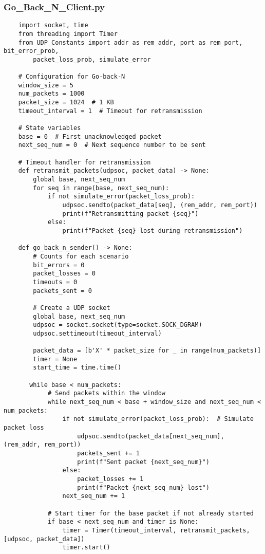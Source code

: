 \documentclass{article}
\begin{document}
\subsubsection{Go\_Back\_N\_Client.py}

\begin{verbatim}
    import socket, time
    from threading import Timer
    from UDP_Constants import addr as rem_addr, port as rem_port, bit_error_prob,
        packet_loss_prob, simulate_error

    # Configuration for Go-back-N
    window_size = 5
    num_packets = 1000
    packet_size = 1024  # 1 KB
    timeout_interval = 1  # Timeout for retransmission

    # State variables
    base = 0  # First unacknowledged packet
    next_seq_num = 0  # Next sequence number to be sent

    # Timeout handler for retransmission
    def retransmit_packets(udpsoc, packet_data) -> None:
        global base, next_seq_num
        for seq in range(base, next_seq_num):
            if not simulate_error(packet_loss_prob):
                udpsoc.sendto(packet_data[seq], (rem_addr, rem_port))
                print(f"Retransmitting packet {seq}")
            else:
                print(f"Packet {seq} lost during retransmission")

    def go_back_n_sender() -> None:
        # Counts for each scenario
        bit_errors = 0
        packet_losses = 0
        timeouts = 0
        packets_sent = 0

        # Create a UDP socket
        global base, next_seq_num
        udpsoc = socket.socket(type=socket.SOCK_DGRAM)
        udpsoc.settimeout(timeout_interval)

        packet_data = [b'X' * packet_size for _ in range(num_packets)]
        timer = None
        start_time = time.time()

       while base < num_packets:
            # Send packets within the window
            while next_seq_num < base + window_size and next_seq_num < num_packets:
                if not simulate_error(packet_loss_prob):  # Simulate packet loss
                    udpsoc.sendto(packet_data[next_seq_num], (rem_addr, rem_port))
                    packets_sent += 1
                    print(f"Sent packet {next_seq_num}")
                else:
                    packet_losses += 1
                    print(f"Packet {next_seq_num} lost")
                next_seq_num += 1

            # Start timer for the base packet if not already started
            if base < next_seq_num and timer is None:
                timer = Timer(timeout_interval, retransmit_packets, [udpsoc, packet_data])
                timer.start()


\end{verbatim}
\end{document}
